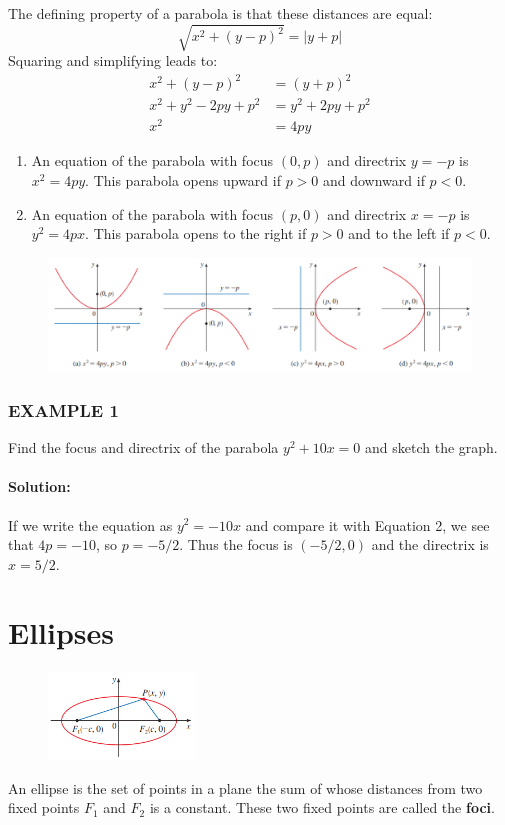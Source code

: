 \documentclass{article}
\begin{document}
The defining property of a parabola is that these distances are equal:
\[
\sqrt{x^2 + (y-p)^2} = |y+p|
\]
Squaring and simplifying leads to:
\begin{align*}
    x^2 + (y-p)^2 &= (y+p)^2 \\
    x^2 + y^2 - 2py + p^2 &= y^2 + 2py + p^2 \\
    x^2 &= 4py
\end{align*}

\begin{enumerate}
    \item An equation of the parabola with focus $(0,p)$ and directrix $y=-p$ is $x^2 = 4py$. This parabola opens upward if $p > 0$ and downward if $p < 0$.
    \item An equation of the parabola with focus $(p,0)$ and directrix $x=-p$ is $y^2 = 4px$. This parabola opens to the right if $p > 0$ and to the left if $p < 0$.
\end{enumerate}
\begin{figure}[htbp]
    \centering
    \includegraphics[width=1\textwidth]{graph53.png}
\end{figure}

\subsubsection*{EXAMPLE 1}
Find the focus and directrix of the parabola $y^2 + 10x = 0$ and sketch the graph.

\paragraph{Solution:} If we write the equation as $y^2 = -10x$ and compare it with Equation 2, we see that $4p = -10$, so $p = -5/2$. Thus the focus is $(-5/2, 0)$ and the directrix is $x = 5/2$.

\section*{Ellipses}
\begin{figure}[htbp]
    \centering
    \includegraphics[width=0.35\textwidth]{graph55.png}
\end{figure}
An ellipse is the set of points in a plane the sum of whose distances from two fixed points $F_1$ and $F_2$ is a constant. These two fixed points are called the \textbf{foci}.
\end{document}
